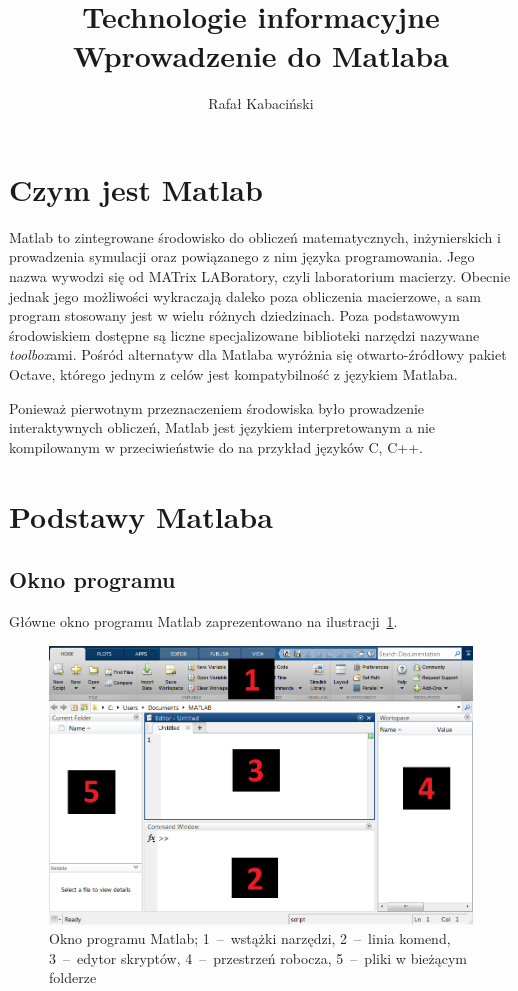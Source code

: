 \documentclass[10pt,a4paper]{article}
\author{Rafał Kabaciński}
\title{Technologie informacyjne\\Wprowadzenie do Matlaba}
\begin{document}
	\maketitle
	\tableofcontents
	\section{Czym jest Matlab}
	
	Matlab to zintegrowane środowisko do obliczeń matematycznych, inżynierskich i prowadzenia symulacji oraz powiązanego z nim języka programowania. Jego nazwa wywodzi się od MATrix LABoratory, czyli laboratorium macierzy. Obecnie jednak jego możliwości wykraczają daleko poza obliczenia macierzowe, a sam program stosowany jest w wielu różnych dziedzinach. Poza podstawowym środowiskiem dostępne są liczne specjalizowane biblioteki narzędzi nazywane \emph{toolbox}ami. Pośród alternatyw dla Matlaba wyróżnia się otwarto-źródłowy pakiet Octave, którego jednym z celów jest kompatybilność z językiem Matlaba.
	
	Ponieważ pierwotnym przeznaczeniem środowiska było prowadzenie interaktywnych obliczeń, Matlab jest językiem interpretowanym a nie kompilowanym w przeciwieństwie do na przykład języków C, C++. 
		
	\section{Podstawy Matlaba}
	
	\subsection{Okno programu}
	
	Główne okno programu Matlab zaprezentowano na ilustracji~\ref{rys:M:Okno}.
	
	\begin{figure}[h!]
		\centering
		\includegraphics[width=1\textwidth]{Ilustracje/Matlab_Okno1.png}
		\caption[Okno programu Matlab]{Okno programu Matlab; 1~--~wstążki narzędzi, 2~--~linia komend, 3~--~edytor skryptów, 4~--~przestrzeń robocza, 5~--~pliki w bieżącym folderze}
		\label{rys:M:Okno}
	\end{figure}
\end{document}
